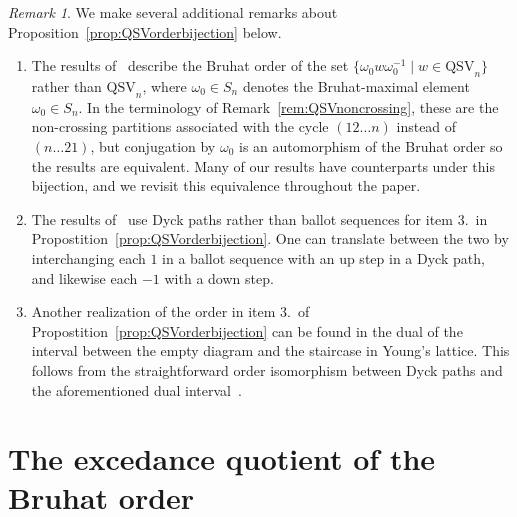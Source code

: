 \documentclass[12pt]{amsart}
\newcommand{\Nantel}[1]{\todo[size=\tiny,inline,color=blue!30]{#1 \\ \hfill --- Nantel}}
\theoremstyle{definition}
\theoremstyle{remark}
\newtheorem{rem}[equation]{Remark}
\numberwithin{equation}{section}
\newcommand{\QSV}{\mathrm{QSV}}
\begin{document}
\begin{rem}\label{rem:auto}
We make several additional remarks about Proposition~\ref{prop:QSVorderbijection} below.
\begin{enumerate}
\item The results of~\cite{GobetWilliams} describe the Bruhat order of the set $\{\omega_0w\omega_0^{-1}\; |\; w \in \QSV_{n}\}$ rather than $\QSV_{n}$, where $\omega_0\in S_n$ denotes the Bruhat-maximal element $\omega_0\in S_n$. 
In the terminology of Remark~\ref{rem:QSVnoncrossing}, these are the non-crossing partitions associated with the cycle $(12\ldots n)$ instead of $(n\ldots 21)$, but conjugation by $\omega_{0}$ is an automorphism of the Bruhat order so the results are equivalent.  Many of our results have counterparts under this bijection, and we revisit this equivalence throughout the paper.


\item The results of~\cite{GobetWilliams} use Dyck paths rather than ballot sequences for item 3.~in Propostition~\ref{prop:QSVorderbijection}.  
One can translate between the two by interchanging each $1$ in a ballot sequence with an up step in a Dyck path, and likewise each $-1$ with a down step.

\item Another realization of the order in item 3.~of Propostition~\ref{prop:QSVorderbijection} can be found in the dual of the interval between the empty diagram and the staircase in Young's lattice.  This follows from the straightforward order isomorphism between Dyck paths and the aforementioned dual interval~\cite[Solution 6.19 vv]{Stanley}.

\end{enumerate}
\end{rem}

\section{The excedance quotient of the Bruhat order}
\label{sec:excedance}
\end{document}
